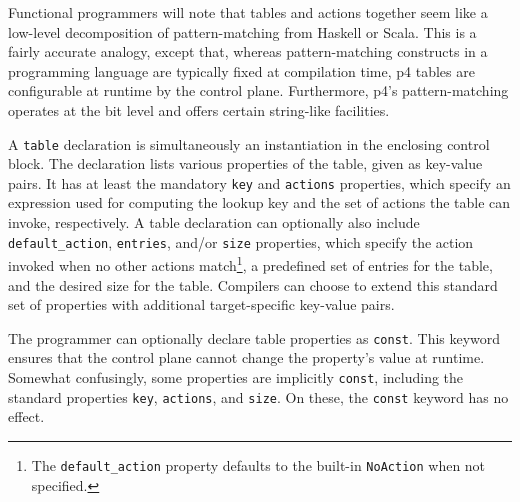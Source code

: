 \begin{tcolorbox}[
	title={\textbf{Analogy to functional programming}},
	colback=decoration!5!white,
	colframe=decoration,
	fonttitle=\bfseries,
	arc=0pt,
	outer arc=0pt,
	boxrule=0.5pt,
	top=2pt,
	bottom=2pt,
	left=2pt,
	right=2pt,
	enlarge top by=1.5\baselineskip,
	enlarge bottom by=1.5\baselineskip
]
	Functional programmers will note that tables and actions together seem like
	a low-level decomposition of pattern-matching from Haskell or Scala. This is
	a fairly accurate analogy, except that, whereas pattern-matching constructs
	in a programming language are typically fixed at compilation time,
	\acrshort{p4} tables are configurable at runtime by the control plane.
	Furthermore, \acrshort{p4}'s pattern-matching operates at the bit level and
	offers certain string-like facilities.
\end{tcolorbox}

A \texttt{table} declaration is simultaneously an instantiation in the enclosing
control block. The declaration lists various properties of the table, given as
key-value pairs. It has at least the mandatory \texttt{key} and \texttt{actions}
properties, which specify an expression used for computing the lookup key and
the set of actions the table can invoke, respectively. A table declaration can
optionally also include \texttt{default\_action}, \texttt{entries}, and/or
\texttt{size} properties, which specify the action invoked when no other actions
match\footnote{The \texttt{default\_action} property defaults to the built-in
\texttt{NoAction} when not specified.}, a predefined set of entries for the
table, and the desired size for the table. Compilers can choose to extend this
standard set of properties with additional target-specific key-value pairs.

The programmer can optionally declare table properties as \texttt{const}. This
keyword ensures that the control plane cannot change the property's value at
runtime. Somewhat confusingly, some properties are implicitly \texttt{const},
including the standard properties \texttt{key}, \texttt{actions}, and
\texttt{size}. On these, the \texttt{const} keyword has no effect.

